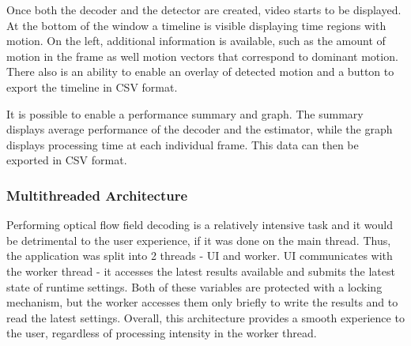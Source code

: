 \documentclass[11pt,english]{report}
\begin{document}
Once both the decoder and the detector are created, video starts to be displayed. At the bottom of the window a timeline is visible displaying time regions with motion. On the left, additional information is available, such as the amount of motion in the frame as well motion vectors that correspond to dominant motion. There also is an ability to enable an overlay of detected motion and a button to export the timeline in CSV format.

It is possible to enable a performance summary and graph. The summary displays average performance of the decoder and the estimator, while the graph displays processing time at each individual frame. This data can then be exported in CSV format.

\subsubsection{Multithreaded Architecture}

Performing optical flow field decoding is a relatively intensive task and it would be detrimental to the user experience, if it was done on the main thread. Thus, the application was split into 2 threads - UI and worker. UI communicates with the worker thread - it accesses the latest results available and submits the latest state of runtime settings. Both of these variables are protected with a locking mechanism, but the worker accesses them only briefly to write the results and to read the latest settings. Overall, this architecture provides a smooth experience to the user, regardless of processing intensity in the worker thread.
\end{document}
